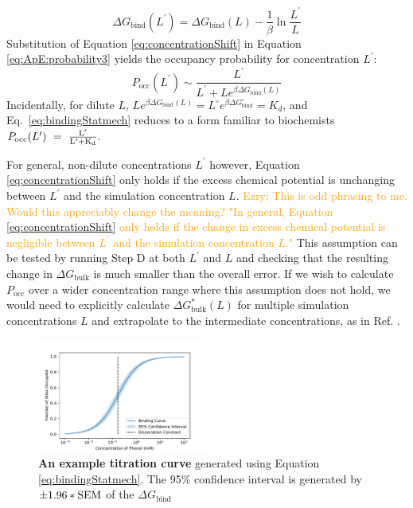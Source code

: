 \documentclass[9pt,tutorial]{Styling/livecoms}
\newcommand{\ezry}[1]{\textcolor{orange}{Ezry: #1}}
\begin{document}
\begin{equation}
\label{eq:concentrationShift}
    \Delta G_\mathrm{bind}(L^\prime)= \Delta G_\mathrm{bind}(L)-\frac{1}{\beta} \ln \frac{L^\prime}{L}
\end{equation}
Substitution of Equation \ref{eq:concentrationShift} in Equation \ref{eq:ApE:probability3} yields the occupancy probability for concentration $L^\prime$:
\begin{equation}\label{eq:bindingStatmech}
    P_\mathrm{occ}(L^\prime)\sim\frac{L^\prime}{L^\prime+{L}e^{\beta \Delta G_\mathrm{bind}(L)}}
    \end{equation} 
Incidentally, for dilute $L$, ${L}e^{\beta \Delta G_\mathrm{bind}(L)}={L^\circ}e^{\beta \Delta G^\circ_\mathrm{bind}}=K_d$,
and Eq.~\ref{eq:bindingStatmech} reduces to  a form familiar to biochemists 
$
    P_\mathrm{occ}(L^\prime)~=~\rm\frac{L^\prime}{L^\prime+K_d}.
$

For general, non-dilute concentrations $L^\prime$ however, Equation \ref{eq:concentrationShift} only holds  if the excess chemical potential is unchanging between $L^\prime$ and the simulation concentration $L$. 
\ezry{This is odd phrasing to me. Would this appreciably change the meaning? "In general, Equation \ref{eq:concentrationShift} only holds if the change in excess chemical potential is negligible between $L^\prime$ and the simulation concentration $L$."} 
This assumption can be tested by running Step D at both $L^\prime$ and $L$ and checking that the resulting change in $\Delta G_\mathrm{bulk}$ is much smaller than the overall error. If we wish to calculate $P_\mathrm{occ}$ over a wider concentration range where this assumption does not hold, we would need to explicitly calculate $\Delta G^*_\mathrm{bulk}(L)$ for multiple simulation concentrations $L$ and extrapolate to the intermediate concentrations, as in Ref. \cite{Salari2018}.
\begin{figure}
    \centering
    \includegraphics[width=0.5\textwidth]{"titration_curve"}
    \caption{\textbf{An example titration curve} generated using Equation \ref{eq:bindingStatmech}. The 95\% confidence interval is generated by $\pm 1.96*\rm SEM$ of the $\Delta G_\mathrm{bind}$}
    \label{fig:titrationCurve}  
\end{figure}
\end{document}
